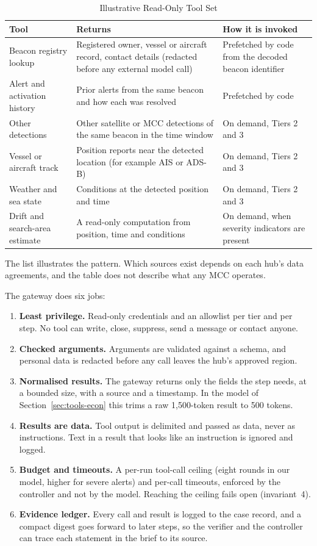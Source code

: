 \documentclass[conference]{IEEEtran}
\begin{document}
\begin{table}[!t]
\caption{Illustrative Read-Only Tool Set}
\label{tab:tools}
\centering
\footnotesize
\begin{tabularx}{\textwidth}{@{}l Y Y@{}}
\toprule
\textbf{Tool} & \textbf{Returns} & \textbf{How it is invoked} \\
\midrule
Beacon registry lookup & Registered owner, vessel or aircraft record, contact details (redacted before any external model call) & Prefetched by code from the decoded beacon identifier \\
Alert and activation history & Prior alerts from the same beacon and how each was resolved & Prefetched by code \\
Other detections & Other satellite or MCC detections of the same beacon in the time window & On demand, Tiers 2 and 3 \\
Vessel or aircraft track & Position reports near the detected location (for example AIS or ADS-B) & On demand, Tiers 2 and 3 \\
Weather and sea state & Conditions at the detected position and time & On demand, Tiers 2 and 3 \\
Drift and search-area estimate & A read-only computation from position, time and conditions & On demand, when severity indicators are present \\
\bottomrule
\end{tabularx}
\par\smallskip\footnotesize The list illustrates the pattern. Which sources exist depends on each hub's data agreements, and the table does not describe what any MCC operates.
\end{table}

The gateway does six jobs:
\begin{enumerate}
\item \textbf{Least privilege.} Read-only credentials and an allowlist per tier and per step. No tool can write, close, suppress, send a message or contact anyone.
\item \textbf{Checked arguments.} Arguments are validated against a schema, and personal data is redacted before any call leaves the hub's approved region.
\item \textbf{Normalised results.} The gateway returns only the fields the step needs, at a bounded size, with a source and a timestamp. In the model of Section~\ref{sec:tools-econ} this trims a raw 1,500-token result to 500 tokens.
\item \textbf{Results are data.} Tool output is delimited and passed as data, never as instructions. Text in a result that looks like an instruction is ignored and logged.
\item \textbf{Budget and timeouts.} A per-run tool-call ceiling (eight rounds in our model, higher for severe alerts) and per-call timeouts, enforced by the controller and not by the model. Reaching the ceiling fails open (invariant~4).
\item \textbf{Evidence ledger.} Every call and result is logged to the case record, and a compact digest goes forward to later steps, so the verifier and the controller can trace each statement in the brief to its source.
\end{enumerate}
\end{document}
